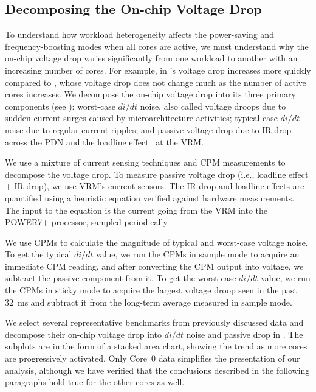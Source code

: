 \subsection{Decomposing the On-chip Voltage Drop}
\label{sec:voltage:rootcause:vdrop-decompose}

To understand how workload heterogeneity affects the power-saving and frequency-boosting modes when all cores are active, we must understand why the on-chip voltage drop varies significantly from one workload to another with an increasing number of cores. For example, in  's voltage drop increases more quickly compared to , whose voltage drop does not change much as the number of active cores increases.  We decompose the on-chip voltage drop into its three primary components (see ): worst-case $di/dt$ noise, also called voltage droops due to sudden current surges caused by microarchitecture activities; typical-case $di/dt$ noise due to regular current ripples; and passive voltage drop due to IR drop across the PDN and the loadline effect~\cite{lefurgy2011active} at the VRM.

We use a mixture of current sensing techniques and CPM measurements to decompose the voltage drop. To measure passive voltage drop (i.e., loadline effect + IR drop), we use VRM's current sensors. The IR drop and loadline effects are quantified using a heuristic equation verified against hardware measurements. The input to the equation is the current going from the VRM into the POWER7+ processor, sampled periodically.

We use CPMs to calculate the magnitude of typical and worst-case voltage noise. To get the typical $di/dt$ value, we run the CPMs in sample mode to acquire an immediate CPM reading, and after converting the CPM output into voltage, we subtract the passive component from it. To get the worst-case $di/dt$ value, we run the CPMs in sticky mode to acquire the largest voltage droop seen in the past 32~ms and subtract it from the long-term average measured in sample mode. 

We select several representative benchmarks from previously discussed data and decompose their on-chip voltage drop into $di/dt$ noise and passive drop in . The subplots are in the form of a stacked area chart, showing the trend as more cores are progressively activated. Only Core~0 data simplifies the presentation of our analysis, although we have verified that the conclusions described in the following paragraphs hold true for the other cores as well.

